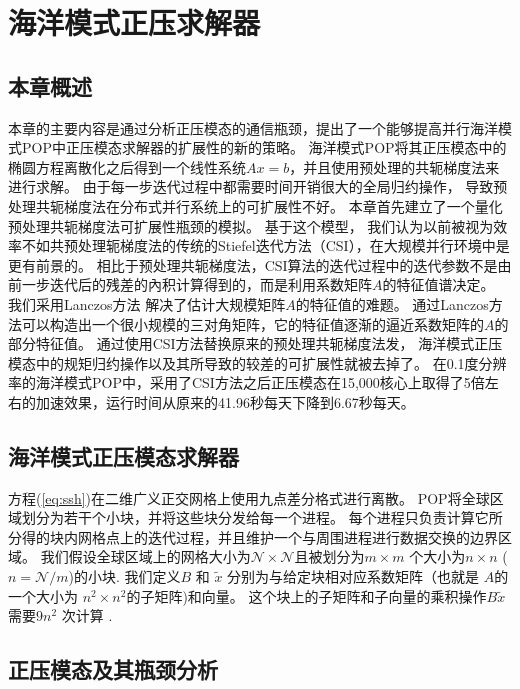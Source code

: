 \chapter{海洋模式正压求解器}
\label{cha:barosSolver}

\section{本章概述}
本章的主要内容是通过分析正压模态的通信瓶颈，提出了一个能够提高并行海洋模式POP中正压模态求解器的扩展性的新的策略。 
 海洋模式POP将其正压模态中的椭圆方程离散化之后得到一个线性系统$Ax=b$，并且使用预处理的共轭梯度法来进行求解。 
 由于每一步迭代过程中都需要时间开销很大的全局归约操作， 导致预处理共轭梯度法在分布式并行系统上的可扩展性不好。 
 本章首先建立了一个量化预处理共轭梯度法可扩展性瓶颈的模拟。
 基于这个模型， 我们认为以前被视为效率不如共预处理轭梯度法的传统的Stiefel迭代方法（CSI），在大规模并行环境中是更有前景的。
相比于预处理共轭梯度法，CSI算法的迭代过程中的迭代参数不是由前一步迭代后的残差的內积计算得到的，而是利用系数矩阵$A$的特征值谱决定。 
我们采用Lanczos方法 解决了估计大规模矩阵$A$的特征值的难题。 
通过Lanczos方法可以构造出一个很小规模的三对角矩阵，它的特征值逐渐的逼近系数矩阵的$A$的部分特征值。 
通过使用CSI方法替换原来的预处理共轭梯度法发， 海洋模式正压模态中的规矩归约操作以及其所导致的较差的可扩展性就被去掉了。 
在0.1度分辨率的海洋模式POP中，采用了CSI方法之后正压模态在15,000核心上取得了5倍左右的加速效果，运行时间从原来的41.96秒每天下降到6.67秒每天。 





\section{海洋模式正压模态求解器}
\label{solver:baro}


方程(\ref{eq:ssh})在二维广义正交网格上使用九点差分格式进行离散。  
POP将全球区域划分为若干个小块，并将这些块分发给每一个进程。
每个进程只负责计算它所分得的块内网格点上的迭代过程，并且维护一个与周围进程进行数据交换的边界区域。 
我们假设全球区域上的网格大小为$\mathcal{N}\times
\mathcal{N}$且被划分为$m\times m$ 个大小为$n\times n$ ($n=\mathcal{N}/m$)的小块.
我们定义$B$ 和 $\tilde{x}$ 分别为与给定块相对应系数矩阵（也就是 $A$的一个大小为 $n^2\times n^2$的子矩阵)和向量。
这个块上的子矩阵和子向量的乘积操作$B\tilde{x}$ 需要$9n^2$ 次计算 \cite{hu2013scalable}.

\section{正压模态及其瓶颈分析}
\label{solver:bottleneck}


